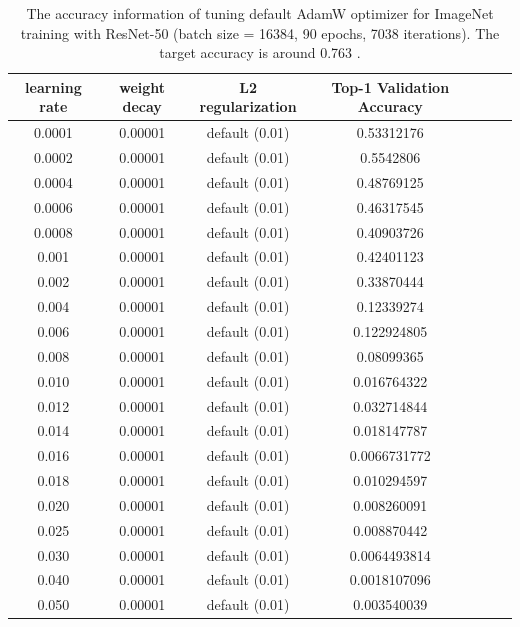 \begin{table}[ht]
\renewcommand{\arraystretch}{1.3}
\caption{The accuracy information of tuning default AdamW optimizer for ImageNet training with ResNet-50 (batch size = 16384, 90 epochs, 7038 iterations). The target accuracy is around 0.763 \citep{goyal2017accurate}.}
\centering
\begin{tabular}{|c|c|c|c|c|c|c|}
\hline
learning rate & weight decay & L2 regularization & Top-1 Validation Accuracy\\
\hline
\hline
0.0001 & 0.00001 & default (0.01) & 0.53312176 \\
\hline
0.0002 & 0.00001 & default (0.01) & 0.5542806 \\
\hline
0.0004 & 0.00001 & default (0.01) & 0.48769125 \\
\hline
0.0006 & 0.00001 & default (0.01) & 0.46317545 \\
\hline
0.0008 & 0.00001 & default (0.01) & 0.40903726 \\
\hline
0.001 & 0.00001 & default (0.01) & 0.42401123 \\
\hline
0.002 & 0.00001 & default (0.01) & 0.33870444 \\
\hline
0.004 & 0.00001 & default (0.01) & 0.12339274 \\
\hline
0.006 & 0.00001 & default (0.01) & 0.122924805 \\
\hline
0.008 & 0.00001 & default (0.01) & 0.08099365 \\
\hline
0.010 & 0.00001 & default (0.01) & 0.016764322 \\
\hline
0.012 & 0.00001 & default (0.01) & 0.032714844 \\
\hline
0.014 & 0.00001 & default (0.01) & 0.018147787 \\
\hline
0.016 & 0.00001 & default (0.01) & 0.0066731772 \\
\hline
0.018 & 0.00001 & default (0.01) & 0.010294597 \\
\hline
0.020 & 0.00001 & default (0.01) & 0.008260091 \\
\hline
0.025 & 0.00001 & default (0.01) & 0.008870442 \\
\hline
0.030 & 0.00001 & default (0.01) & 0.0064493814 \\
\hline
0.040 & 0.00001 & default (0.01) & 0.0018107096 \\
\hline
0.050 & 0.00001 & default (0.01) & 0.003540039 \\
\hline
\end{tabular}
\label{table:imagenet_adamw_default_l2_1}
\end{table}


